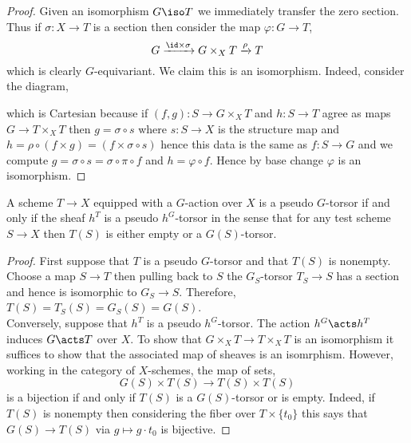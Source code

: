 \documentclass[12pt]{article}
\begin{document}
\begin{proof}
Given an isomorphism $G \iso T$ we immediately transfer the zero section. Thus if $\sigma : X \to T$ is a section then consider the map $\varphi : G \to T$,
\[ G \xrightarrow{\id \times \sigma} G \times_X T \xrightarrow{\rho} T \]
which is clearly $G$-equivariant. We claim this is an isomorphism. Indeed, consider the diagram,
\begin{center}
\end{center}
which is Cartesian because if $(f, g) : S \to G \times_X T$ and $h : S \to T$ agree as maps $G \to T \times_X T$ then $g = \sigma \circ s$ where $s : S \to X$ is the structure map and $h = \rho \circ (f \times g) = (f \times \sigma \circ s)$ hence this data is the same as $f : S \to G$ and we compute $g = \sigma \circ s = \sigma \circ \pi \circ f$ and $h = \varphi \circ f$. Hence by base change $\varphi$ is an isomorphism.   
\end{proof}

\begin{prop}
A scheme $T \to X$ equipped with a $G$-action over $X$ is a pseudo $G$-torsor if and only if the sheaf $h^T$ is a pseudo $h^G$-torsor in the sense that for any test scheme $S \to X$ then $T(S)$ is either empty or a $G(S)$-torsor.
\end{prop}

\begin{proof}
First suppose that $T$ is a pseudo $G$-torsor and that $T(S)$ is nonempty. Choose a map $S \to T$ then pulling back to $S$ the $G_S$-torsor $T_S \to S$ has a section and hence is isomorphic to $G_S \to S$. Therefore, $T(S) = T_S(S) = G_S(S) = G(S)$.
\bigskip\\
Conversely, suppose that $h^T$ is a pseudo $h^G$-torsor. The action $h^G \acts h^T$ induces $G \acts T$ over $X$. To show that $G \times_X T \to T \times_X T$ is an isomorphism it suffices to show that the associated map of sheaves is an isomrphism. However, working in the category of $X$-schemes, the map of sets,
\[ G(S) \times T(S) \to T(S) \times T(S) \]
is a bijection if and only if $T(S)$ is a $G(S)$-torsor or is empty. Indeed, if $T(S)$ is nonempty then considering the fiber over $T \times \{ t_0 \}$ this says that $G(S) \to T(S)$ via $g \mapsto g \cdot t_0$ is bijective.
\end{proof}
\end{document}
